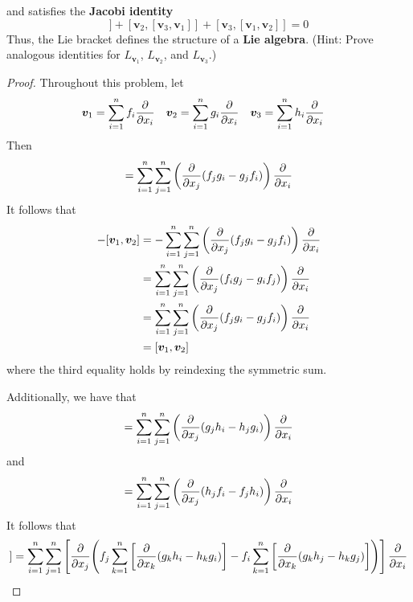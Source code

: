 \documentclass[../psets.tex]{subfiles}
\begin{document}
\begin{enumerate}[label={\textbf{2.1.\roman*.}}]
\begin{equation*}
    \end{equation*}
    and satisfies the \textbf{Jacobi identity}
    \begin{equation*}
        [\bm{v}_1,[\bm{v}_2,\bm{v}_3]]+[\bm{v}_2,[\bm{v}_3,\bm{v}_1]]+[\bm{v}_3,[\bm{v}_1,\bm{v}_2]] = 0
    \end{equation*}
    Thus, the Lie bracket defines the structure of a \textbf{Lie algebra}. (Hint: Prove analogous identities for $L_{\bm{v}_1}$, $L_{\bm{v}_2}$, and $L_{\bm{v}_3}$.)
    \begin{proof}
        Throughout this problem, let
        \begin{align*}
            \bm{v}_1 &= \sum_{i=1}^nf_i\pdv{x_i}&
            \bm{v}_2 &= \sum_{i=1}^ng_i\pdv{x_i}&
            \bm{v}_3 &= \sum_{i=1}^nh_i\pdv{x_i}
        \end{align*}
        Then
        \begin{equation*}
            [\bm{v}_1,\bm{v}_2] = \sum_{i=1}^n\sum_{j=1}^n\left( \pdv{x_j}(f_jg_i-g_jf_i) \right)\pdv{x_i}
        \end{equation*}
        It follows that
        \begin{align*}
            -[\bm{v}_1,\bm{v}_2] &= -\sum_{i=1}^n\sum_{j=1}^n\left( \pdv{x_j}(f_jg_i-g_jf_i) \right)\pdv{x_i}\\
            &= \sum_{i=1}^n\sum_{j=1}^n\left( \pdv{x_j}(f_ig_j-g_if_j) \right)\pdv{x_i}\\
            &= \sum_{i=1}^n\sum_{j=1}^n\left( \pdv{x_j}(f_jg_i-g_jf_i) \right)\pdv{x_i}\\
            &= [\bm{v}_1,\bm{v}_2]
        \end{align*}
        where the third equality holds by reindexing the symmetric sum.\par
        Additionally, we have that
        \begin{equation*}
            [\bm{v}_2,\bm{v}_3] = \sum_{i=1}^n\sum_{j=1}^n\left( \pdv{x_j}(g_jh_i-h_jg_i) \right)\pdv{x_i}
        \end{equation*}
        and
        \begin{equation*}
            [\bm{v}_3,\bm{v}_1] = \sum_{i=1}^n\sum_{j=1}^n\left( \pdv{x_j}(h_jf_i-f_jh_i) \right)\pdv{x_i}
        \end{equation*}
        It follows that
        \begin{align*}
            [\bm{v}_1,[\bm{v}_2,\bm{v}_3]] &= \sum_{i=1}^n\sum_{j=1}^n\left[ \pdv{x_j}(f_j\sum_{k=1}^n\left[ \pdv{x_k}(g_kh_i-h_kg_i) \right]-f_i\sum_{k=1}^n\left[ \pdv{x_k}(g_kh_j-h_kg_j) \right]) \right]\pdv{x_i}\\

\end{align*}
\end{proof}
\end{enumerate}
\end{document}
